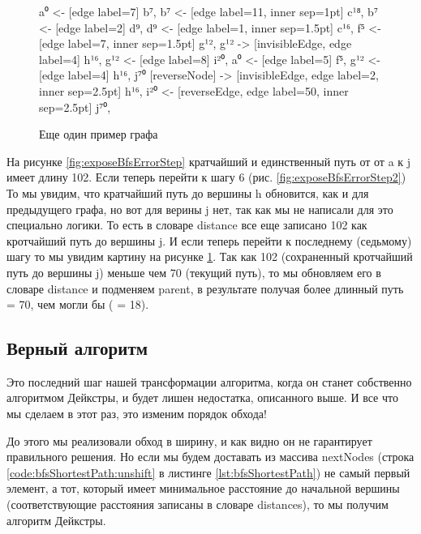 \documentclass[../article.tex]{subfiles}
\begin{document}
\begin{figure*}
\begin{subfigure}{0.32\textwidth}
{            a⁰ <- [edge label=7] b⁷,
            b⁷ <- [edge label=11, inner sep=1pt] c¹⁸,
            b⁷ <- [edge label=2] d⁹,
            d⁹ <- [edge label=1, inner sep=1.5pt] c¹⁶,
            f⁵ <- [edge label=7, inner sep=1.5pt] g¹²,
            g¹² -> [invisibleEdge, edge label=4] h¹⁶,
            g¹² <- [edge label=8] i²⁰,
            a⁰ <- [edge label=5] f⁵,
            g¹² <- [edge label=4] h¹⁶,
            j⁷⁰ [reverseNode] -> [invisibleEdge, edge label=2, inner sep=2.5pt] h¹⁶,
            i²⁰ <- [reverseEdge, edge label=50, inner sep=2.5pt] j⁷⁰,
        }
        \caption{Еще один пример графа}
        \label{fig:exposeBfsErrorStep3}
    \end{subfigure}
\end{figure*}


На рисунке \ref{fig:exposeBfsErrorStep} кратчайший и единственный путь от от {\firacodebold a} к {\firacodebold j} имеет длину 102. Если теперь перейти к шагу 6 (рис. \ref{fig:exposeBfsErrorStep2}) То мы увидим, что кратчайший путь до вершины {\firacodebold h} обновится, как и для предыдущего графа, но вот для верины {\firacodebold j} нет, так как мы не написали для это специально логики. То есть в словаре distance все еще записано 102 как кротчайший путь до вершины {\firacodebold j}. И если теперь перейти к последнему (седьмому) шагу то мы увидим картину на рисунке \ref{fig:exposeBfsErrorStep3}. Так как 102 (сохраненный кротчайший путь до вершины j) меньше чем 70 (текущий путь), то мы обновляем его в словаре distance и подменяем {\firacodebold parent}, в результате получая более длинный путь {\firacodebold [j, i, g, f, a]} = 70, чем могли бы ({\firacodebold [j, h, ,g, f, a]} = 18).

\subsection{Верный алгоритм}

Это последний шаг нашей трансформации алгоритма, когда он станет собственно алгоритмом Дейкстры, и будет лишен недостатка, описанного выше. И все что мы сделаем в этот раз, это изменим порядок обхода!

До этого мы реализовали обход в ширину, и как видно он не гарантирует правильного решения. Но если мы будем доставать из массива {\firacodebold nextNodes} (строка \ref{code:bfsShortestPath:unshift} в листинге \ref{lst:bfsShortestPath}) не самый первый элемент, а тот, который имеет минимальное расстояние до начальной вершины (соответствующие расстояния записаны в словаре {\firacodebold distances}), то мы получим алгоритм Дейкстры.
\end{document}
